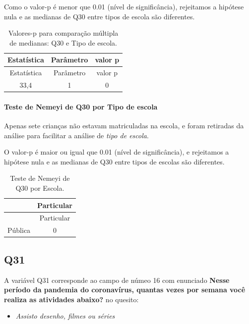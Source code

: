 \documentclass[]{article}
\providecommand{\tightlist}{%
  \setlength{\itemsep}{0pt}\setlength{\parskip}{0pt}}
\let\oldparagraph\paragraph
\renewcommand{\paragraph}[1]{\oldparagraph{#1}\mbox{}}
\begin{document}
Como o valor-p é menor que 0.01 (nível de significância), rejeitamos a hipótese nula e as medianas de Q30 entre tipos de escola são diferentes.

\begin{longtable}[]{@{}ccc@{}}
\caption{\label{tab:unnamed-chunk-1004}Valores-p para comparação múltipla de medianas: Q30 e Tipo de escola.}\tabularnewline
\toprule
Estatística & Parâmetro & valor p\tabularnewline
\midrule
\endfirsthead
\toprule
Estatística & Parâmetro & valor p\tabularnewline
\midrule
\endhead
33,4 & 1 & 0\tabularnewline
\bottomrule
\end{longtable}

\hypertarget{teste-de-nemeyi-de-q30-por-tipo-de-escola}{%
\paragraph{Teste de Nemeyi de Q30 por Tipo de escola}\label{teste-de-nemeyi-de-q30-por-tipo-de-escola}}

Apenas sete crianças não estavam matriculadas na escola, e foram retiradas da análise para facilitar a análise de \emph{tipo de escola}.

O valor-p é maior ou igual que 0.01 (nível de significância), e rejeitamos a hipótese nula e as medianas de Q30 entre tipos de escolas são diferentes.

\begin{longtable}[]{@{}lc@{}}
\caption{\label{tab:unnamed-chunk-1006}Teste de Nemeyi de Q30 por Escola.}\tabularnewline
\toprule
& Particular\tabularnewline
\midrule
\endfirsthead
\toprule
& Particular\tabularnewline
\midrule
\endhead
Pública & 0\tabularnewline
\bottomrule
\end{longtable}

\cleardoublepage

\hypertarget{q31}{%
\subsection{Q31}\label{q31}}

A variável Q31 corresponde ao campo de númeo 16 com enunciado \textbf{Nesse período da pandemia do coronavírus, quantas vezes por semana você realiza as atividades abaixo?} no quesito:

\begin{itemize}
\tightlist
\item
  \emph{Assisto desenho, filmes ou séries}
\end{itemize}
\end{document}
